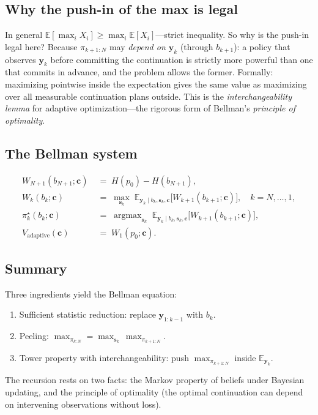 \documentclass[11pt,a4paper]{article}
\newcommand{\E}{\mathbb{E}}
\newcommand{\argmax}{\operatorname{argmax}}
\begin{document}
\subsection{Why the push-in of the max is legal}

In general $\E[\max_i X_i] \ge \max_i \E[X_i]$---strict inequality.  So why is the push-in legal here?  Because $\pi_{k+1:N}$ may \emph{depend on $\bm{y}_k$} (through $b_{k+1}$): a policy that observes $\bm{y}_k$ before committing the continuation is strictly more powerful than one that commits in advance, and the problem allows the former.  Formally: maximizing pointwise inside the expectation gives the same value as maximizing over all measurable continuation plans outside.  This is the \emph{interchangeability lemma} for adaptive optimization---the rigorous form of Bellman's \emph{principle of optimality}.

\subsection{The Bellman system}

\begin{align}
  W_{N+1}(b_{N+1}; \bm{c}) &\;=\; H(p_0) - H(b_{N+1}),\\
  W_k(b_k; \bm{c}) &\;=\; \max_{\bm{s}_k}\; \E_{\bm{y}_k \mid b_k, \bm{s}_k, \bm{c}}\!\bigl[W_{k+1}(b_{k+1}; \bm{c})\bigr], \quad k = N, \ldots, 1,\\
  \pi^\star_k(b_k; \bm{c}) &\;=\; \argmax_{\bm{s}_k}\; \E_{\bm{y}_k \mid b_k, \bm{s}_k, \bm{c}}\!\bigl[W_{k+1}(b_{k+1}; \bm{c})\bigr],\\
  V_{\mathrm{adaptive}}(\bm{c}) &\;=\; W_1(p_0; \bm{c}).
\end{align}

\subsection{Summary}

Three ingredients yield the Bellman equation:
\begin{enumerate}[nosep, label=(\alph*)]
  \item Sufficient statistic reduction: replace $\bm{y}_{1:k-1}$ with $b_k$.
  \item Peeling: $\max_{\pi_{k:N}} = \max_{\bm{s}_k}\,\max_{\pi_{k+1:N}}$.
  \item Tower property with interchangeability: push $\max_{\pi_{k+1:N}}$ inside $\E_{\bm{y}_k}$.
\end{enumerate}
The recursion rests on two facts: the Markov property of beliefs under Bayesian updating, and the principle of optimality (the optimal continuation can depend on intervening observations without loss).
\end{document}
